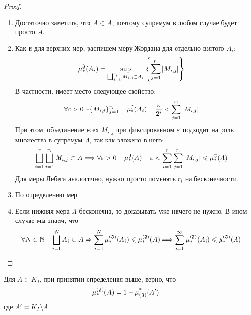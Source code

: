 \begin{proof}~
	\begin{enumerate}
		\item Достаточно заметить, что $A \subset A$, поэтому супремум в любом случае будет просто $A$.
		
		\item Как и для верхних мер, распишем меру Жордана для отдельно взятого $A_i$:
		\[
			\operatorname{\mu^\mathfrak{J}_*}(A_i) = \sup_{\bigsqcup_{j = 1}^{r_i} M_{i, j} \subset A_i} \left\{\sum_{j = 1}^{r_i} |M_{i, j}|\right\}
		\]
		В частности, имеет место следующее свойство:
		\[
			\forall \varepsilon > 0\ \exists \{M_{i, j}\}_{j = 1}^{r_i} \ \big|\  \operatorname{\mu^\mathfrak{J}_*}(A_i) - \frac{\varepsilon}{2^i} < \sum_{j = 1}^{r_i} |M_{i, j}|
		\]
		При этом, объединение всех $M_{i, j}$ при фиксированном $\varepsilon$ подходит на роль множества в супремум $A$, так как вложено в него:
		\[
			\bigsqcup_{i = 1}^r \bigsqcup_{j = 1}^{r_i} M_{i, j} \subset A \Longrightarrow \forall \varepsilon > 0 \quad \operatorname{\mu^\mathfrak{J}_*}(A) - \varepsilon < \sum_{i = 1}^r \sum_{j = 1}^{r_i} |M_{i, j}|\leqslant \operatorname{\mu^\mathfrak{J}_*}(A)
		\]
		Для меры Лебега аналогично, нужно просто поменять $r_i$ на бесконечности.
		
		\item По определению мер
		
		\item Если нижняя мера $A$ бесконечна, то доказывать уже ничего не нужно. В ином случае мы знаем, что
		\[
			\forall N \in \mathbb{N} \quad \bigsqcup_{i = 1}^N A_i \subset A \Rightarrow \sum_{i = 1}^N \operatorname{\mu^{(\mathfrak{J})}_*}(A_i) \leqslant \operatorname{\mu^{(\mathfrak{J})}_*}(A) \Longrightarrow \sum_{i = 1}^\infty \operatorname{\mu^{(\mathfrak{J})}_*}(A_i) \leqslant \operatorname{\mu^{(\mathfrak{J})}_*}(A)
		\]
	\end{enumerate}
\end{proof}

\begin{proposition}
	Для $A \subset K_I$, при принятии определения выше, верно, что
	\[
		\operatorname{\mu^{(\mathfrak{J})}_*}(A) = 1 - \operatorname{\mu^*_{(\mathfrak{J})}}(A')
	\]
	где $A' = K_I \backslash A$
\end{proposition}

